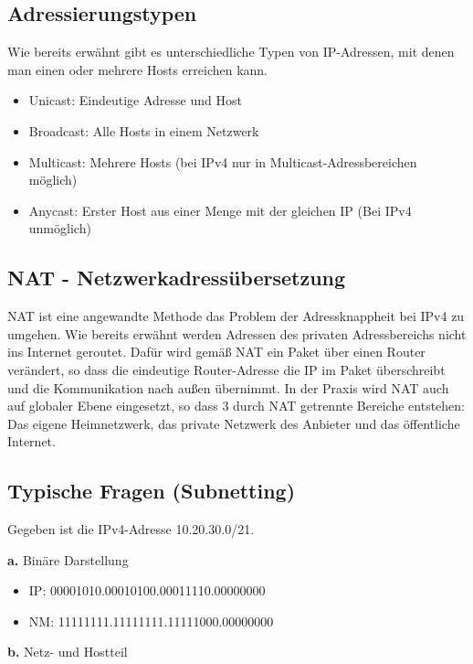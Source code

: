\subsection{Adressierungstypen}

Wie bereits erwähnt gibt es unterschiedliche Typen von IP-Adressen, mit denen man einen oder mehrere Hosts erreichen kann.

\begin{itemize}
    \item Unicast: Eindeutige Adresse und Host
    \item Broadcast: Alle Hosts in einem Netzwerk
    \item Multicast: Mehrere Hosts (bei IPv4 nur in Multicast-Adressbereichen möglich)
    \item Anycast: Erster Host aus einer Menge mit der gleichen IP (Bei IPv4 unmöglich)
\end{itemize}

\subsection{NAT - Netzwerkadressübersetzung}

NAT ist eine angewandte Methode das Problem der Adressknappheit bei IPv4 zu umgehen. Wie bereits erwähnt werden Adressen des privaten Adressbereichs nicht ins Internet geroutet. Dafür wird gemäß NAT ein Paket über einen Router verändert, so dass die eindeutige Router-Adresse die IP im Paket überschreibt und die Kommunikation nach außen übernimmt. In der Praxis wird NAT auch auf globaler Ebene eingesetzt, so dass 3 durch NAT getrennte Bereiche entstehen: Das eigene Heimnetzwerk, das private Netzwerk des Anbieter und das öffentliche Internet.

\subsection{Typische Fragen (Subnetting)}

Gegeben ist die IPv4-Adresse 10.20.30.0/21.

\textbf{a.} Binäre Darstellung

\begin{itemize}
    \item IP: 00001010.00010100.00011110.00000000
    \item NM: 11111111.11111111.11111000.00000000
\end{itemize}

\textbf{b.} Netz- und Hostteil

